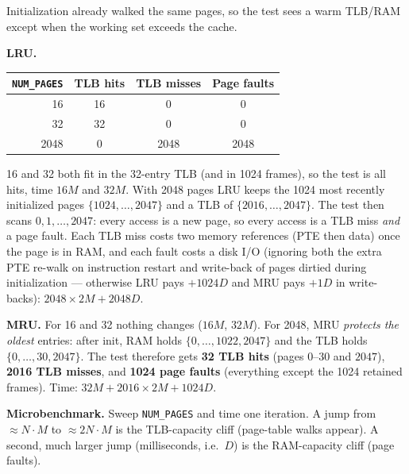 \documentclass[11pt,a4paper]{article}
\newenvironment{Sol}{%
  \begin{tcolorbox}[sboxstyle, title={Solution}]%
}{%
  \end{tcolorbox}\vspace{0.35em}%
}
\begin{document}
\begin{Sol}
Initialization already walked the same pages, so the test sees a warm
TLB/RAM except when the working set exceeds the cache.

\textbf{LRU.}
\begin{center}
\begin{tabular}{rccc}
\hline
\texttt{NUM\_PAGES} & TLB hits & TLB misses & Page faults \\
\hline
16   & 16   & 0    & 0 \\
32   & 32   & 0    & 0 \\
2048 & 0    & 2048 & 2048 \\
\hline
\end{tabular}
\end{center}
16 and 32 both fit in the 32-entry TLB (and in 1024 frames), so the
test is all hits, time $16M$ and $32M$. With 2048 pages LRU keeps the
1024 most recently initialized pages $\{1024,\ldots,2047\}$ and a TLB of
$\{2016,\ldots,2047\}$. The test then scans $0,1,\ldots,2047$: every
access is a new page, so every access is a TLB miss \emph{and} a page
fault. Each TLB miss costs two memory references (PTE then data) once
the page is in RAM, and each fault costs a disk I/O (ignoring both the
extra PTE re-walk on instruction restart and write-back of pages dirtied
during initialization --- otherwise LRU pays $+1024D$ and MRU pays $+1D$
in write-backs):
$2048\times 2M + 2048D$.

\textbf{MRU.} For 16 and 32 nothing changes ($16M$, $32M$). For 2048,
MRU \emph{protects the oldest} entries: after init, RAM holds
$\{0,\ldots,1022,2047\}$ and the TLB holds $\{0,\ldots,30,2047\}$. The
test therefore gets \textbf{32 TLB hits} (pages $0$--$30$ and $2047$),
\textbf{2016 TLB misses}, and \textbf{1024 page faults} (everything
except the 1024 retained frames). Time:
$32M + 2016\times 2M + 1024D$.

\textbf{Microbenchmark.} Sweep \texttt{NUM\_PAGES} and time one
iteration. A jump from $\approx N\cdot M$ to $\approx 2N\cdot M$ is the
TLB-capacity cliff (page-table walks appear). A second, much larger jump
(milliseconds, i.e.\ $D$) is the RAM-capacity cliff (page faults).
\end{Sol}
\end{document}
